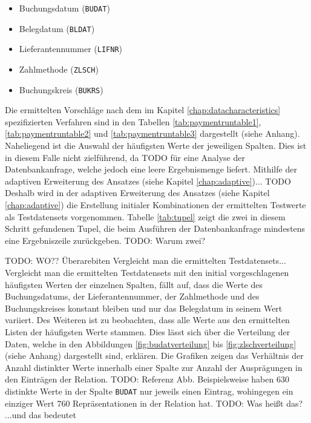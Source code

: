    \begin{itemize}
      \item Buchungsdatum (\texttt{BUDAT})
      \item Belegdatum (\texttt{BLDAT})
			\item Lieferantennummer (\texttt{LIFNR})
			\item Zahlmethode (\texttt{ZLSCH})
			\item Buchungskreis (\texttt{BUKRS})
   \end{itemize}
	
Die ermittelten Vorschläge nach dem im Kapitel \ref{chap:datacharacteristics} spezifizierten Verfahren sind in den Tabellen \ref{tab:paymentruntable1}, \ref{tab:paymentruntable2} und \ref{tab:paymentruntable3} dargestellt (siehe Anhang).
Naheliegend ist die Auswahl der häufigsten Werte der jeweiligen Spalten.
Dies ist in diesem Falle nicht zielführend, da TODO
 für eine Analyse der Datenbankanfrage, welche jedoch eine leere Ergebnismenge liefert.
Mithilfe der adaptiven Erweiterung des Ansatzes (siehe Kapitel \ref{chap:adaptive})... TODO
Deshalb wird in der adaptiven Erweiterung des Ansatzes (siehe Kapitel \ref{chap:adaptive}) die Erstellung initialer Kombinationen der ermittelten Testwerte als Testdatensets vorgenommen.
Tabelle \ref{tab:tupel} zeigt die zwei in diesem Schritt gefundenen Tupel, die beim Ausführen der Datenbankanfrage mindestens eine Ergebniszeile zurückgeben.
TODO: Warum zwei?
\begin{table}[h]
	\centering
	\caption{Gefundene Tupel für Testdatensets inklusive Ausführungszeiten}
	\label{tab:tupel}
\end{table}

TODO: WO?? Überarebiten
Vergleicht man die ermittelten Testdatensets...
Vergleicht man die ermittelten Testdatensets mit den initial vorgeschlagenen häufigsten Werten der einzelnen Spalten, fällt auf, dass die Werte des Buchungsdatums, der Lieferantennummer, der Zahlmethode und des Buchungskreises konstant bleiben und nur das Belegdatum in seinem Wert variiert.
Des Weiteren ist zu beobachten, dass alle Werte aus den ermittelten Listen der häufigsten Werte stammen.
Dies lässt sich über die Verteilung der Daten, welche in den Abbildungen \ref{fig:budatverteilung} bis \ref{fig:zlschverteilung} (siehe Anhang) dargestellt sind, erklären.
Die Grafiken zeigen das Verhältnis der Anzahl distinkter Werte innerhalb einer Spalte zur Anzahl der Ausprägungen in den Einträgen der Relation.
TODO: Referenz Abb.
Beispielsweise haben 630 distinkte Werte in der Spalte \texttt{BUDAT} nur jeweils einen Eintrag, wohingegen ein einziger Wert 760 Repräsentationen in der Relation hat.
TODO: Was heißt das? ...und das bedeutet

